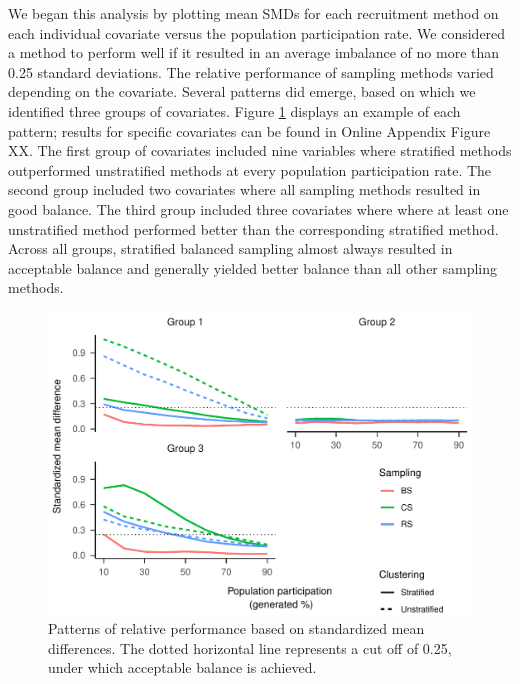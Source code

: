 \documentclass[
  english,
  man,floatsintext]{apa6}
\begin{document}
We began this analysis by plotting mean SMDs for each recruitment method on each individual covariate versus the population participation rate. We considered a method to perform well if it resulted in an average imbalance of no more than 0.25 standard deviations. The relative performance of sampling methods varied depending on the covariate. Several patterns did emerge, based on which we identified three groups of covariates. Figure \ref{fig:fig-SMD-groups} displays an example of each pattern; results for specific covariates can be found in Online Appendix Figure XX. The first group of covariates included nine variables where stratified methods outperformed unstratified methods at every population participation rate. The second group included two covariates where all sampling methods resulted in good balance. The third group included three covariates where where at least one unstratified method performed better than the corresponding stratified method. Across all groups, stratified balanced sampling almost always resulted in acceptable balance and generally yielded better balance than all other sampling methods.



\begin{figure}
\centering
\includegraphics{6---Paper_files/figure-latex/fig-SMD-groups-1.pdf}
\caption{\label{fig:fig-SMD-groups}Patterns of relative performance based on standardized mean differences. The dotted horizontal line represents a cut off of 0.25, under which acceptable balance is achieved.}
\end{figure}
\end{document}
